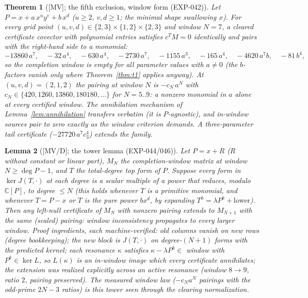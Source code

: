 \documentclass[11pt]{article}
\newtheorem{theorem}{Theorem}[section]
\newtheorem{lemma}[theorem]{Lemma}
\theoremstyle{remark}
\newcommand{\C}{\mathbb{C}}
\begin{document}
\begin{theorem}[{[MV]}; the fifth exclusion, window form (EXP-042)]\label{thm:t5}
Let $P = x + a\,x^u y^v + b\,x^d$ ($u \ge 2$, $v, d \ge 1$; the minimal shape swallowing
$x$). For every grid point $(u, v, d) \in \{2,3\} \times \{1,2\} \times \{2,3\}$ and window
$N = 7$, a cleared certificate covector with polynomial entries satisfies $c^T M = 0$
identically and pairs with the right-hand side to a \emph{monomial}:
\[
-13860\,a^7,\quad -32\,a^4,\quad -630\,a^4,\quad -2730\,a^7,\quad -1155\,a^3,\quad
-165\,a^4,\quad -4620\,a^7 b,\quad -81\,b^4,
\]
so the completion window is empty for \emph{all} parameter values with $a \ne 0$ (the
$b$-factors vanish only where Theorem~\ref{thm:t1} applies anyway). At $(u, v, d) =
(2, 1, 2)$ the pairing at window $N$ is $-c_N\,a^N$ with $c_N \in \{420, 1260, 13860,
180180, \dots\}$ for $N = 5..9$: a nonzero monomial in $a$ alone at every certified window.
The annihilation mechanism of Lemma~\ref{lem:annihilation} transfers verbatim (it is
$P$-agnostic), and in-window sources pair to zero exactly as the window criterion demands.
A three-parameter tail certificate ($-27720\,a^7 c_3^4$) extends the family.
\end{theorem}

\begin{lemma}[{[MV/D]}; the tower lemma (EXP-044/046)]\label{lem:tower}
Let $P = x + R$ ($R$ without constant or linear part), $M_N$ the completion-window
matrix at window $N \ge \deg P - 1$, and $T$ the total-degree top form of $P$. Suppose
every form in $\ker J(T, \cdot)$ at each degree is a scalar multiple of a power that
reduces, modulo $\C[P]$, to degree $\le N$ (this holds whenever $T$ is a primitive
monomial, and whenever $T = P - x$ or $T$ is the pure power $b x^d$, by expanding
$T^k = \lambda P^k + \text{lower}$). Then any left-null certificate of $M_N$ with
nonzero pairing extends to $M_{N+1}$ with the same (scaled) pairing: window
inconsistency propagates to every larger window. Proof ingredients, each
machine-verified: old columns vanish on new rows (degree bookkeeping); the new block is
$J(T, \cdot)$ on degree-$(N{+}1)$ forms with the predicted kernel; each resonance
$\kappa$ satisfies $\kappa - \lambda P^k \in$ window with $P^k \in \ker L$, so
$L(\kappa)$ is an in-window image which every certificate annihilates; the extension
was realized explicitly across an active resonance (window $8 \to 9$, ratio $2$,
pairing preserved). The measured window law ($-c_N a^N$ pairings with the odd-prime
$2N - 3$ ratios) is this tower seen through the clearing normalization.
\end{lemma}
\end{document}
